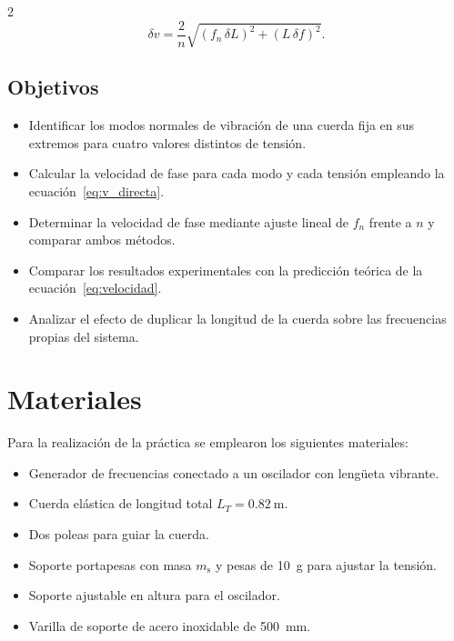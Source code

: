 \documentclass[12pt,a4paper]{article}
\newcommand{\Ltotal}{\SI{0.82}{\metre}}
\newcommand{\ms}{m_{\mathrm{s}}}
\begin{document}
\begin{multicols}{2}
\begin{equation}
  \delta v = \frac{2}{n}\sqrt{(f_n\,\delta L)^2 + (L\,\delta f)^2}.
  \label{eq:deltav}
\end{equation}

\subsection{Objetivos}

\begin{itemize}
  \item Identificar los modos normales de vibración de una cuerda fija en sus extremos para cuatro valores distintos de tensión.
  \item Calcular la velocidad de fase para cada modo y cada tensión empleando la ecuación~\eqref{eq:v_directa}.
  \item Determinar la velocidad de fase mediante ajuste lineal de $f_n$ frente a $n$ y comparar ambos métodos.
  \item Comparar los resultados experimentales con la predicción teórica de la ecuación~\eqref{eq:velocidad}.
  \item Analizar el efecto de duplicar la longitud de la cuerda sobre las frecuencias propias del sistema.
\end{itemize}

\section{Materiales}

Para la realización de la práctica se emplearon los siguientes materiales:

\begin{itemize}
  \item Generador de frecuencias conectado a un oscilador con lengüeta vibrante.
  \item Cuerda elástica de longitud total $L_T = \Ltotal$.
  \item Dos poleas para guiar la cuerda.
  \item Soporte portapesas con masa $\ms$ y pesas de \SI{10}{\gram} para ajustar la tensión.
  \item Soporte ajustable en altura para el oscilador.
  \item Varilla de soporte de acero inoxidable de \SI{500}{\milli\metre}.
\end{itemize}


\end{multicols}
\end{document}
